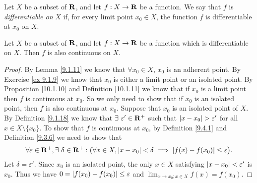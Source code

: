\begin{definition}\label{10.1.11}
    Let \(X\) be a subset of \(\mathbf{R}\), and let \(f : X \to \mathbf{R}\) be a function.
    We say that \(f\) is \emph{differentiable on} \(X\) if, for every limit point \(x_0 \in X\), the function \(f\) is differentiable at \(x_0\) on \(X\).
\end{definition}

\begin{corollary}\label{10.1.12}
    Let \(X\) be a subset of \(\mathbf{R}\), and let \(f : X \to \mathbf{R}\) be a function which is differentiable on \(X\).
    Then \(f\) is also continuous on \(X\).
\end{corollary}

\begin{proof}
    By Lemma \ref{9.1.11} we know that \(\forall x_0 \in X\), \(x_0\) is an adherent point.
    By Exercise \ref{ex 9.1.9} we know that \(x_0\) is either a limit point or an isolated point.
    By Proposition \ref{10.1.10} and Definition \ref{10.1.11} we know that if \(x_0\) is a limit point then \(f\) is continuous at \(x_0\).
    So we only need to show that if \(x_0\) is an isolated point, then \(f\) is also continuous at \(x_0\).
    Suppose that \(x_0\) is an isolated point of \(X\).
    By Definition \ref{9.1.18} we know that \(\exists\ \varepsilon' \in \mathbf{R}^+\) such that \(\left\lvert x - x_0\right\rvert > \varepsilon'\) for all \(x \in X \setminus \{x_0\}\).
    To show that \(f\) is continuous at \(x_0\), by Definition \ref{9.4.1} and Definition \ref{9.3.6} we need to show that
    \[
        \forall \varepsilon \in \mathbf{R}^+, \exists\ \delta \in \mathbf{R}^+ : \big(\forall x \in X, \left\lvert x - x_0\right\rvert < \delta \implies \left\lvert f(x) - f(x_0)\right\rvert \leq \varepsilon\big).
    \]
    Let \(\delta = \varepsilon'\).
    Since \(x_0\) is an isolated point, the only \(x \in X\) satisfying \(\left\lvert x - x_0\right\rvert < \varepsilon'\) is \(x_0\).
    Thus we have \(0 = \left\lvert f(x_0) - f(x_0)\right\rvert \leq \varepsilon\) and \(\lim_{x \to x_0 ; x \in X} f(x) = f(x_0)\).
\end{proof}

